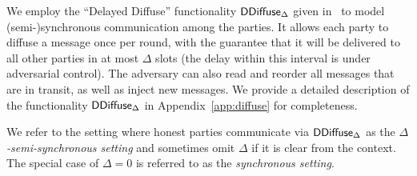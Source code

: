We employ the ``Delayed Diffuse'' functionality $\mathsf{DDiffuse}_\Delta$ given in~\cite{praos} to
model (semi-)synchronous communication among the parties. It allows each party
to diffuse a message once per round, with the guarantee that it will be
delivered to all other parties in at most $\Delta$ slots (the delay within this
interval is under adversarial control). The adversary can also read and reorder
all messages that are in transit, as well as inject new messages.
We provide a detailed description of the functionality $\mathsf{DDiffuse}_\Delta$ in
Appendix~\ref{app:diffuse} for completeness.

We refer to the setting where honest parties communicate via $\mathsf{DDiffuse}_\Delta$
as the \emph{$\Delta$-semi-synchronous setting} and sometimes omit $\Delta$ if
it is clear from the context. The special case of $\Delta=0$ is referred to as
the \emph{synchronous setting}.
